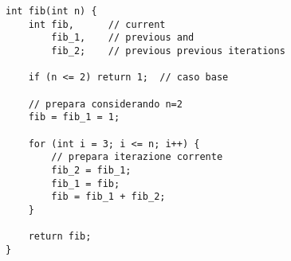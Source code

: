 \documentclass{article}
\begin{document}
\begin{lstlisting}[caption=Calcolo di Fibonacci, label=fibonacci]
int fib(int n) {
    int fib,      // current
        fib_1,    // previous and
        fib_2;    // previous previous iterations

    if (n <= 2) return 1;  // caso base

    // prepara considerando n=2
    fib = fib_1 = 1;

    for (int i = 3; i <= n; i++) {
        // prepara iterazione corrente
        fib_2 = fib_1;
        fib_1 = fib;
        fib = fib_1 + fib_2;
    }

    return fib;
}
\end{lstlisting}
\end{document}
